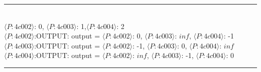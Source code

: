 \documentclass[11pt]{article}  %
\begin{document}
\noindent
\rule{5in}{.1pt}
\noindent \\
{$\langle P:4c002\rangle $: 0, $\langle P:4c003\rangle$: 1,$\langle P:4c004\rangle$: 2}\\
$\langle P:4c002\rangle$:OUTPUT: output = {$\langle P:4c002\rangle$: 0, $\langle P:4c003\rangle$: $inf$, $\langle P:4c004\rangle$: -1}\\
$\langle P:4c003\rangle$:OUTPUT: output = {$\langle P:4c002\rangle$: -1, $\langle P:4c003\rangle$: 0, $\langle P:4c004\rangle$: $inf$}\\
$\langle P:4c004\rangle$:OUTPUT: output = {$\langle P:4c002\rangle$: $inf$, $\langle P:4c003\rangle$: -1, $\langle P:4c004\rangle$: 0}\\
\rule{5in}{.1pt}\par
\end{document}

